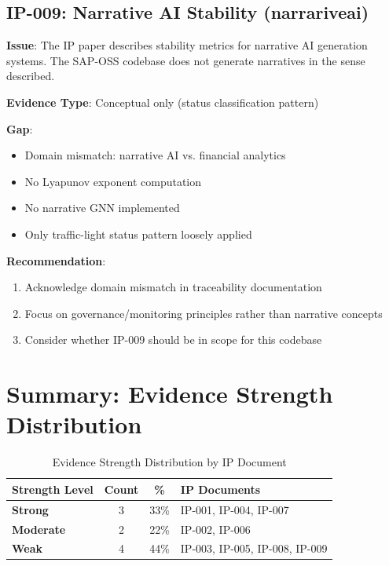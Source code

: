 \subsection{IP-009: Narrative AI Stability (narrariveai)}

\begin{tcolorbox}[colback=red!5,colframe=red!70,title=\faIcon{exclamation-triangle} Weak Traceability: IP-009]
\textbf{Issue}: The IP paper describes stability metrics for narrative AI generation systems. The SAP-OSS codebase does not generate narratives in the sense described.

\textbf{Evidence Type}: Conceptual only (status classification pattern)

\textbf{Gap}: 
\begin{itemize}[nosep]
    \item Domain mismatch: narrative AI vs. financial analytics
    \item No Lyapunov exponent computation
    \item No narrative GNN implemented
    \item Only traffic-light status pattern loosely applied
\end{itemize}

\textbf{Recommendation}: 
\begin{enumerate}[nosep]
    \item Acknowledge domain mismatch in traceability documentation
    \item Focus on governance/monitoring principles rather than narrative concepts
    \item Consider whether IP-009 should be in scope for this codebase
\end{enumerate}
\end{tcolorbox}

\section{Summary: Evidence Strength Distribution}

\begin{table}[H]
\centering
\caption{Evidence Strength Distribution by IP Document}
\label{tab:strength-distribution}
\begin{tabular}{@{}lccl@{}}
\toprule
\textbf{Strength Level} & \textbf{Count} & \textbf{\%} & \textbf{IP Documents} \\
\midrule
\textcolor{green!60!black}{\textbf{Strong}} & 3 & 33\% & IP-001, IP-004, IP-007 \\
\textcolor{yellow!60!black}{\textbf{Moderate}} & 2 & 22\% & IP-002, IP-006 \\
\textcolor{red!60!black}{\textbf{Weak}} & 4 & 44\% & IP-003, IP-005, IP-008, IP-009 \\
\bottomrule
\end{tabular}
\end{table}

